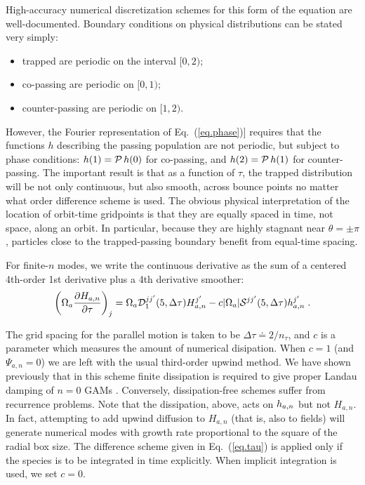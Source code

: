 \noindent
High-accuracy numerical discretization schemes for this form 
of the equation are well-documented.  Boundary conditions on 
physical distributions can be stated very simply: 
\begin{itemize}
\item
trapped are periodic on the interval $[0,2)$;
\item 
co-passing are periodic on $[0,1)$;
\item
counter-passing are periodic on $[1,2)$.  
\end{itemize}

\noindent
However, the Fourier representation of Eq.~(\ref{eq.phase})] 
requires that the functions $h$ describing the passing population 
are not periodic, but subject to phase conditions: 
$h(1) = {\cal P} \, h(0)$ for co-passing, and $h(2) = {\cal P} \, h(1)$
for counter-passing.  
The important result is that as a function of $\tau$, the 
trapped distribution will be not only continuous, but also 
smooth, across bounce points no matter what order 
difference scheme is used.  The obvious physical 
interpretation of the location of orbit-time gridpoints 
is that they are equally spaced in time, not space, along an 
orbit.  In particular, because they are highly stagnant near 
$\theta=\pm \pi$, particles close to the trapped-passing boundary
benefit from equal-time spacing.

For finite-$n$ modes, we write the continuous derivative as the 
sum of a centered 4th-order 1st derivative plus a 4th derivative 
smoother:
%
\begin{equation}
\left( \Omega_a \frac{\partial H_{a,n}}{\partial \tau} \right)_j =
\Omega_a {\cal D}_1^{jj^\prime}(5,\Delta\tau) H_{a,n}^{j^\prime} 
 - c |\Omega_a| {\cal S}^{jj^\prime}(5,\Delta\tau) h_{a,n}^{j^\prime} \; .
\label{eq.tau}
\end{equation}

\noindent
The grid spacing for the parallel motion is taken
to be $\Delta\tau \doteq 2/n_\tau$, and $c$ is a parameter which 
measures the amount of numerical disipation.  When $c=1$ (and 
$\Psi_{a,n} = 0$) we are left with the usual third-order upwind method.
We have shown previously that in this scheme finite dissipation 
is required to give proper Landau damping of $n=0$ GAMs \cite{candy:2003}.  
Conversely, dissipation-free schemes suffer from recurrence problems.
Note that the dissipation, above, acts on $h_{a,n}$ but not $H_{a,n}$.  
In fact, attempting to add upwind diffusion to $H_{a,n}$ (that is, also 
to fields) will generate numerical modes with growth rate proportional to 
the square of the radial box size.  The difference scheme given in 
Eq.~(\ref{eq.tau}) is applied only if the species is to be integrated
in time explicitly.  When implicit integration is used, we set $c=0$.

